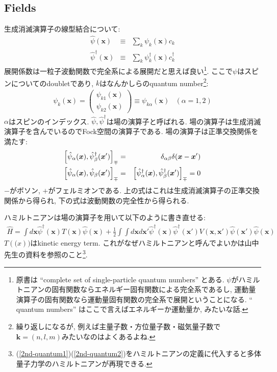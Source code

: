 \documentclass[10.5pt,a4paper]{jreport}
\begin{document}
\subsection{Fields}
生成消滅演算子の線型結合について:
\begin{eqnarray}
  \hat{\psi}(\bm{x}) &\equiv& \sum_k\psi_k(\bm{x})c_k\label{2nd-quantum1}\\
  \hat{\psi}^\dagger(\bm{x}) &\equiv& \sum_k\psi_k^\dagger(\bm{x})c^\dagger_k\label{2nd-quantum2}
\end{eqnarray}
展開係数は一粒子波動関数で完全系による展開だと思えば良い\footnote{原書は ``complete set of single-particle quantum numbers'' とある. $\psi$がハミルトニアンの固有関数ならエネルギー固有関数による完全系であるし, 運動量演算子の固有関数なら運動量固有関数の完全系で展開ということになる. `` quantum numbers'' はここで言えばエネルギーか運動量か, みたいな話. }. ここで$\psi$はスピンについてのdoubletであり, $k$はなんかしらのquantum number\footnote{繰り返しになるが, 例えば主量子数・方位量子数・磁気量子数で$\bm{k} = (n, l, m)$みたいなのはよくあるよね. }:
\begin{eqnarray}
  \psi_k(\bm{x}) =
  \begin{pmatrix}
    \psi_{k1}(\bm{x})\\
    \psi_{k2}(\bm{x})
  \end{pmatrix}
  \equiv \psi_{k\alpha}(\bm{x}) & (\alpha = 1, 2)
\end{eqnarray}
$\alpha$はスピンのインデックス. $\hat{\psi}, \hat{\psi}^\dagger$は場の演算子と呼ばれる. 場の演算子は生成消滅演算子を含んでいるのでFock空間の演算子である. 場の演算子は正準交換関係を満たす:
\begin{eqnarray}
  \qty[\hat{\psi}_\alpha(\bm{x}), \hat{\psi}_\beta^\dagger(\bm{x}')]_{\mp} &=& \delta_{\alpha\beta}\delta(\bm{x} - \bm{x}')\\
  \qty[\hat{\psi}_\alpha(\bm{x}), \hat{\psi}_\beta(\bm{x}')]_{\mp} &=&\qty[\hat{\psi}^\dagger_\alpha(\bm{x}), \hat{\psi}^\dagger_\beta(\bm{x}')]_{\mp} = 0
\end{eqnarray}
$-$がボソン, $+$がフェルミオンである. 上の式はこれは生成消滅演算子の正準交換関係から得られ, 下の式は波動関数の完全性から得られる.

ハミルトニアンは場の演算子を用いて以下のように書き直せる:
\begin{eqnarray}
  \hat{H} = \int d\bm{x} \hat{\psi}^\dagger(\bm{x})T(\bm{x})\hat{\psi}(\bm{x}) + \frac{1}{2}\int\int d\bm{x}d\bm{x}' \hat{\psi}^\dagger(\bm{x})\hat{\psi}^\dagger(\bm{x}')V(\bm{x}, \bm{x}')\hat{\psi}(\bm{x}')\hat{\psi}(\bm{x})
\end{eqnarray}
$T(\bm(x))$はkinetic energy term. これがなぜハミルトニアンと呼んでよいかは山中先生の資料を参照のこと\footnote{(\ref{2nd-quantum1})(\ref{2nd-quantum2})をハミルトニアンの定義に代入すると多体量子力学のハミルトニアンが再現できる. }.
\end{document}
